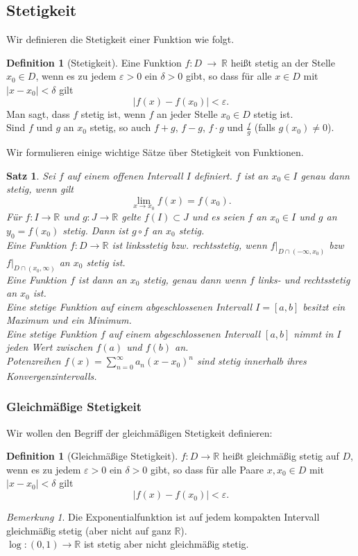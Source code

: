 \documentclass[fontsize=12pt,paper=a4,twoside,bibtotoc,idxtotoc,
liststotoc,pagesize,BCOR1.2cm,DIV15,chapterprefix,pagesize=pdftex]{scrbook}
\theoremstyle{plain}
\newtheorem{sz}[equation]{Satz}
\theoremstyle{definition}
\newtheorem{df}[equation]{Definition}
\theoremstyle{remark}
\newtheorem{bem}[equation]{Bemerkung}
\begin{document}
\subsection{Stetigkeit}
Wir definieren die Stetigkeit einer Funktion wie folgt.
\begin{df}[Stetigkeit]
Eine Funktion $f:D \ \rightarrow  \ \mathbb{R}$ heißt stetig an
der Stelle $x_0 \in D$, wenn es zu jedem $\varepsilon>0$ ein $\delta>0$
gibt, so dass für alle $x \in D$ mit $|x - x_0| < \delta$ gilt
\[ |f(x)-f(x_0) | < \varepsilon .\]
Man sagt, dass $f$ stetig ist, wenn $f$ an jeder Stelle $x_0
\in D$ stetig ist. \\
Sind $f$ und $g$ an $x_0$ stetig, so auch $f+g$, $f-g$, $f \cdot g$
und $\frac{f}{g}$ (falls $g(x_0) \neq 0$). 
\end{df}
Wir formulieren einige wichtige Sätze über Stetigkeit von Funktionen.
\begin{sz}
 Sei $f$ auf einem offenen Intervall $I$ definiert. $f$ ist an
$x_0 \in I$ genau dann stetig, wenn gilt
\[ \lim_{x \rightarrow x_0} f(x) = f(x_0). \]
 Für $f:I \rightarrow \mathbb{R}$ und $g:J \rightarrow
\mathbb{R}$ gelte $f(I) \subset J$ und es seien $f$ an $x_0 \in I$ und
$g$ an $y_0=f(x_0)$ stetig. Dann ist $g \circ f$ an $x_0$ stetig.\\
Eine Funktion $f: D \rightarrow \mathbb{R}$ ist linksstetig bzw. rechtsstetig, wenn $f|_{D\cap (-\infty,x_0)}$
bzw  $f|_{D\cap (x_0,\infty)}$ an $x_0$ stetig ist.\\
Eine Funktion $f$ ist dann an $x_0$ stetig, genau dann wenn $f$ links- und rechtsstetig
an $x_0$ ist.\\
Eine stetige Funktion auf einem abgeschlossenen Intervall $I=[a,b]$
besitzt ein Maximum und ein Minimum.\\
Eine stetige Funktion $f$ auf einem abgeschlossenen  Intervall
$[a,b]$ nimmt in $I$ jeden Wert zwischen $f(a)$ und $f(b)$ an.\\
Potenzreihen $f(x)=\sum_{n=0}^\infty a_n (x-x_0)^n$ sind stetig
innerhalb ihres Konvergenzintervalls.
\end{sz}
\subsubsection{Gleichmäßige Stetigkeit}
Wir wollen den Begriff der gleichmäßigen Stetigkeit definieren:
\begin{df}[Gleichmäßige Stetigkeit]
$f: D \rightarrow \mathbb{R}$ heißt gleichmäßig stetig auf $D$,
wenn es zu jedem $\varepsilon >0$ ein $\delta>0$ gibt, so dass für alle
Paare $x,x_0 \in D$ mit $|x - x_0|< \delta$ gilt
\[ | f(x)-f(x_0)| < \varepsilon. \]
\end{df}
\begin{bem}
 Die Exponentialfunktion ist auf jedem kompakten Intervall
gleichmäßig stetig (aber nicht auf ganz $\mathbb{R}$).\\
 $\log:(0,1) \rightarrow \mathbb{R}$ ist stetig aber nicht
gleichmäßig stetig.
\end{bem}
\end{document}
